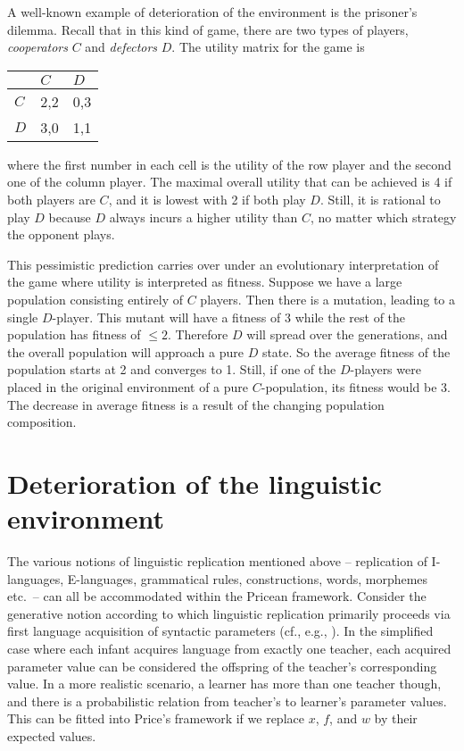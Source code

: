 \documentclass[output=paper,hidelinks]{langscibook}
\begin{document}
A well-known example of deterioration of the environment is the prisoner's dilemma. Recall
that in this kind of game, there are two types of players, \emph{cooperators} $C$ and
\emph{defectors} $D$. The utility matrix for the game is
\begin{center}
  \begin{tabular}{lll}
    \toprule
        & $C$ & $D$ \\\midrule
    $C$ & 2,2 & 0,3 \\
    $D$ & 3,0 & 1,1 \\\bottomrule
  \end{tabular}
\end{center}
where the first number in each cell is the utility of the row player and the second one of
the column player. The maximal overall utility that can be achieved is 4 if both players
are $C$, and it is lowest with 2 if both play $D$. Still, it is rational to play $D$
because $D$ always incurs a higher utility than $C$, no matter which strategy the opponent
plays.

This pessimistic prediction carries over under an evolutionary interpretation of the game
where utility is interpreted as fitness. Suppose we have a large population consisting
entirely of $C$ players. Then there is a mutation, leading to a single $D$-player. This
mutant will have a fitness of 3 while the rest of the population has fitness of $\leq
2$. Therefore $D$ will spread over the generations, and the overall population will
approach a pure $D$ state. So the average fitness of the population starts at 2 and
converges to 1. Still, if one of the $D$-players were placed in the original environment
of a pure $C$-population, its fitness would be 3. The decrease in average fitness is a
result of the changing population composition.

\section{Deterioration of the linguistic environment}

The various notions of linguistic replication mentioned above -- replication of
I-languages, E-languages, grammatical rules, constructions, words, morphemes etc.\ -- can
all be accommodated within the Pricean framework. Consider the generative notion according
to which linguistic replication primarily proceeds via first language acquisition of
syntactic parameters (cf., e.g., \citealt{lightfoot99}). In the simplified case where each
infant acquires language from exactly one teacher, each acquired parameter value can be
considered the offspring of the teacher's corresponding value. In a more realistic
scenario, a learner has more than one teacher though, and there is a probabilistic
relation from teacher's to learner's parameter values. This can be fitted into Price's
framework if we replace $x$, $f$, and $w$ by their expected values.
\end{document}
